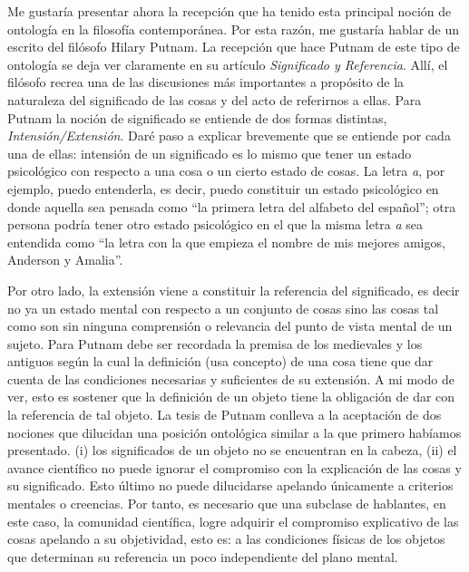 \documentclass[]{book}
\begin{document}
\begin{refsection}
Me gustaría presentar ahora la recepción que ha tenido esta principal
noción de ontología en la filosofía contemporánea. Por esta razón, me
gustaría hablar de un escrito del filósofo Hilary Putnam. La recepción
que hace Putnam de este tipo de ontología se deja ver claramente en su
artículo \emph{Significado y Referencia}. Allí, el filósofo recrea una
de las discusiones más importantes a propósito de la naturaleza del
significado de las cosas y del acto de referirnos a ellas. Para Putnam
la noción de significado se entiende de dos formas distintas,
\emph{Intensión/Extensión}. Daré paso a explicar brevemente que se
entiende por cada una de ellas: intensión de un significado es lo mismo
que tener un estado psicológico con respecto a una cosa o un cierto
estado de cosas. La letra \emph{a}, por ejemplo, puedo entenderla, es
decir, puedo constituir un estado psicológico en donde aquella sea
pensada como ``la primera letra del alfabeto del español''; otra persona
podría tener otro estado psicológico en el que la misma letra \emph{a}
sea entendida como ``la letra con la que empieza el nombre de mis
mejores amigos, Anderson y Amalia''.

Por otro lado, la extensión viene a constituir la referencia del
significado, es decir no ya un estado mental con respecto a un conjunto
de cosas sino las cosas tal como son sin ninguna comprensión o
relevancia del punto de vista mental de un sujeto. Para Putnam debe ser
recordada la premisa de los medievales y los antiguos según la cual la
definición (usa concepto) de una cosa tiene que dar cuenta de las
condiciones necesarias y suficientes de su extensión. A mi modo de ver,
esto es sostener que la definición de un objeto tiene la obligación de
dar con la referencia de tal objeto. La tesis de Putnam conlleva a la
aceptación de dos nociones que dilucidan una posición ontológica similar
a la que primero habíamos presentado. (i) los significados de un objeto
no se encuentran en la cabeza, (ii) el avance científico no puede
ignorar el compromiso con la explicación de las cosas y su significado.
Esto último no puede dilucidarse apelando únicamente a criterios
mentales o creencias. Por tanto, es necesario que una subclase de
hablantes, en este caso, la comunidad científica, logre adquirir el
compromiso explicativo de las cosas apelando a su objetividad, esto es:
a las condiciones físicas de los objetos que determinan su referencia un
poco independiente del plano mental.


\end{refsection}
\end{document}
